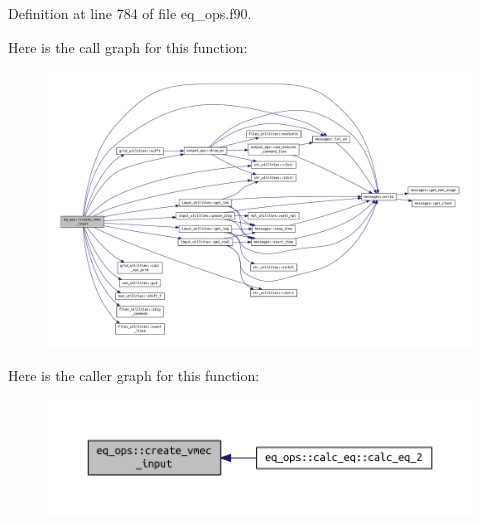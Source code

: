 Definition at line 784 of file eq\+\_\+ops.\+f90.

Here is the call graph for this function\+:\nopagebreak
\begin{figure}[H]
\begin{center}
\leavevmode
\includegraphics[width=350pt]{namespaceeq__ops_a9addef683b3d4a8c587510e4c994ec61_cgraph}
\end{center}
\end{figure}
Here is the caller graph for this function\+:\nopagebreak
\begin{figure}[H]
\begin{center}
\leavevmode
\includegraphics[width=350pt]{namespaceeq__ops_a9addef683b3d4a8c587510e4c994ec61_icgraph}
\end{center}
\end{figure}
\mbox{\label{namespaceeq__ops_ac0a79893900631d25b170be0abd2c131}} 

